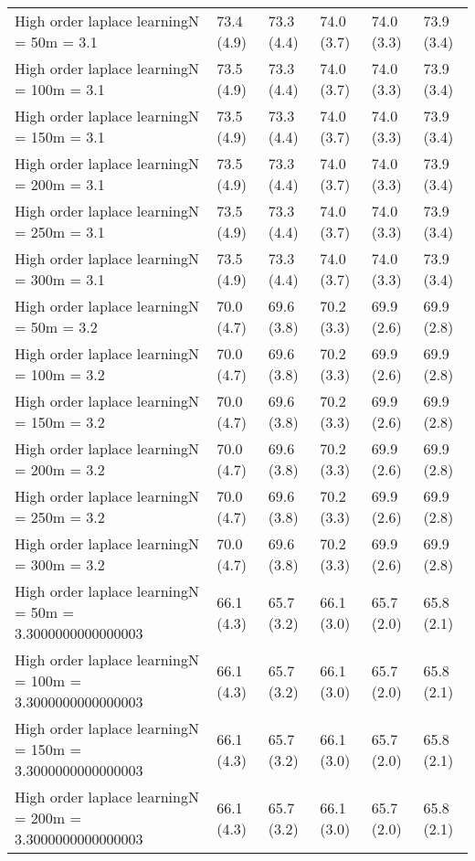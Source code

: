 \documentclass{article}
\begin{document}
\begin{table*}[t!]
\begin{center}
\begin{small}
\begin{sc}
\begin{tabular}{llllll}
High order laplace learningN = 50m = 3.1&73.4 (4.9)      &73.3 (4.4)      &74.0 (3.7)      &74.0 (3.3)      &73.9 (3.4)      \\
High order laplace learningN = 100m = 3.1&73.5 (4.9)      &73.3 (4.4)      &74.0 (3.7)      &74.0 (3.3)      &73.9 (3.4)      \\
High order laplace learningN = 150m = 3.1&73.5 (4.9)      &73.3 (4.4)      &74.0 (3.7)      &74.0 (3.3)      &73.9 (3.4)      \\
High order laplace learningN = 200m = 3.1&73.5 (4.9)      &73.3 (4.4)      &74.0 (3.7)      &74.0 (3.3)      &73.9 (3.4)      \\
High order laplace learningN = 250m = 3.1&73.5 (4.9)      &73.3 (4.4)      &74.0 (3.7)      &74.0 (3.3)      &73.9 (3.4)      \\
High order laplace learningN = 300m = 3.1&73.5 (4.9)      &73.3 (4.4)      &74.0 (3.7)      &74.0 (3.3)      &73.9 (3.4)      \\
High order laplace learningN = 50m = 3.2&70.0 (4.7)      &69.6 (3.8)      &70.2 (3.3)      &69.9 (2.6)      &69.9 (2.8)      \\
High order laplace learningN = 100m = 3.2&70.0 (4.7)      &69.6 (3.8)      &70.2 (3.3)      &69.9 (2.6)      &69.9 (2.8)      \\
High order laplace learningN = 150m = 3.2&70.0 (4.7)      &69.6 (3.8)      &70.2 (3.3)      &69.9 (2.6)      &69.9 (2.8)      \\
High order laplace learningN = 200m = 3.2&70.0 (4.7)      &69.6 (3.8)      &70.2 (3.3)      &69.9 (2.6)      &69.9 (2.8)      \\
High order laplace learningN = 250m = 3.2&70.0 (4.7)      &69.6 (3.8)      &70.2 (3.3)      &69.9 (2.6)      &69.9 (2.8)      \\
High order laplace learningN = 300m = 3.2&70.0 (4.7)      &69.6 (3.8)      &70.2 (3.3)      &69.9 (2.6)      &69.9 (2.8)      \\
High order laplace learningN = 50m = 3.3000000000000003&66.1 (4.3)      &65.7 (3.2)      &66.1 (3.0)      &65.7 (2.0)      &65.8 (2.1)      \\
High order laplace learningN = 100m = 3.3000000000000003&66.1 (4.3)      &65.7 (3.2)      &66.1 (3.0)      &65.7 (2.0)      &65.8 (2.1)      \\
High order laplace learningN = 150m = 3.3000000000000003&66.1 (4.3)      &65.7 (3.2)      &66.1 (3.0)      &65.7 (2.0)      &65.8 (2.1)      \\
High order laplace learningN = 200m = 3.3000000000000003&66.1 (4.3)      &65.7 (3.2)      &66.1 (3.0)      &65.7 (2.0)      &65.8 (2.1)      \\

\end{tabular}
\end{sc}
\end{small}
\end{center}
\end{table*}
\end{document}
